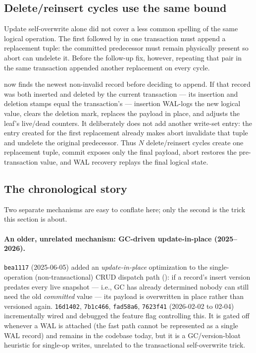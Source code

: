 \documentclass[11pt]{article}
\newcommand{\commit}[1]{\texttt{#1}}
\begin{document}
\subsection{Delete/reinsert cycles use the same bound}

Update self-overwrite alone did not cover a less common spelling of the same logical
operation. The first  followed by  in one
transaction must append a replacement tuple: the committed predecessor must remain
physically present so abort can undelete it. Before the follow-up fix, however, repeating
that pair in the same transaction appended another replacement on every cycle.

 now finds the newest non-invalid record before deciding to append.
If that record was both inserted and deleted by the current transaction --- its insertion
and deletion stamps equal the transaction's  --- insertion WAL-logs the new
logical value, clears the deletion mark, replaces the payload in place, and adjusts the
leaf's live/dead counters. It deliberately does not add another write-set entry: the
entry created for the first replacement already makes abort invalidate that tuple and
undelete the original predecessor. Thus $N$ delete/reinsert cycles create one replacement
tuple, commit exposes only the final payload, abort restores the pre-transaction value,
and WAL recovery replays the final logical state.

\subsection{The chronological story}

Two separate mechanisms are easy to conflate here; only the second is the trick this
section is about.

\paragraph{An older, unrelated mechanism: GC-driven update-in-place (2025--2026).}
\commit{bea1117} (2025-06-05) added an \emph{update-in-place} optimization to the
single-operation (non-transactional) CRUD dispatch path
(): if a record's insert version predates every live
snapshot --- i.e., GC has already determined nobody can still need the old
\emph{committed} value --- its payload is overwritten in place rather than versioned
again. \commit{16d1402}, \commit{7b1c466}, \commit{fad58a6}, \commit{7623f41}
(2026-02-02 to 02-04) incrementally wired and debugged the feature flag controlling this.
It is gated off whenever a WAL is attached (the fast path cannot be represented as a
single WAL record) and remains in the codebase today, but it is a GC/version-bloat
heuristic for single-op writes, unrelated to the transactional self-overwrite trick.
\end{document}
